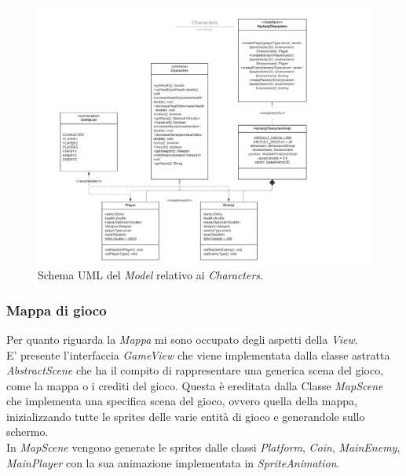 \begin{figure}[H]
	\centering{}
	\includegraphics[width=1.3\textwidth]{./img/characters_uml.png} 
	\caption{Schema UML del \emph{Model} relativo ai \emph{Characters}.}
	\label{img:uml_model_characters}
\end{figure}

\subsubsection*{Mappa di gioco} %

\textsf{\small Per quanto riguarda la \emph{Mappa} mi sono occupato degli aspetti della \emph{View}.}\\

\textsf{\small E' presente l'interfaccia \emph{GameView} che viene implementata dalla classe astratta \emph{AbstractScene} che ha il compito di rappresentare una generica scena del gioco, come la mappa o i crediti del gioco. Questa è ereditata dalla Classe \emph{MapScene} che implementa una specifica scena del gioco, ovvero quella della mappa, inizializzando tutte le sprites delle varie entità di gioco e generandole sullo schermo.}\\

\textsf{\small In \emph{MapScene} vengono generate le sprites dalle classi \emph{Platform}, \emph{Coin}, \emph{MainEnemy}, \emph{MainPlayer} con la sua animazione implementata in \emph{SpriteAnimation}.}\\


